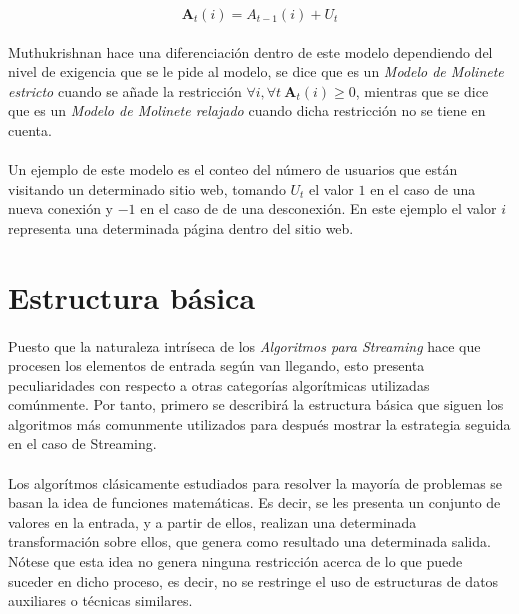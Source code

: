 \documentclass{subfiles}
\begin{document}
        \begin{equation}
        \label{eq:streaming_turnstile}
          \boldsymbol{A}_{t}(i) = {A}_{t-1}(i) + U_{t}
        \end{equation}

        \paragraph{}
        Muthukrishnan \cite{Muthukrishnan:2005:DSA:1166409.1166410} hace una diferenciación dentro de este modelo dependiendo del nivel de exigencia que se le pide al modelo, se dice que es un \emph{Modelo de Molinete estricto} cuando se añade la restricción $\forall i, \forall t \ \boldsymbol{A}_{t}(i) \geq 0$, mientras que se dice que es un \emph{Modelo de Molinete relajado} cuando dicha restricción no se tiene en cuenta.

        \paragraph{}
        Un ejemplo de este modelo es el conteo del número de usuarios que están visitando un determinado sitio web, tomando $U_t$ el valor $1$ en el caso de una nueva conexión y $-1$ en el caso de de una desconexión. En este ejemplo el valor $i$ representa una determinada página dentro del sitio web.

    \section{Estructura básica}
    \label{sec:streaming_structure}

      \paragraph{}
      Puesto que la naturaleza intríseca de los \emph{Algoritmos para Streaming} hace que procesen los elementos de entrada según van llegando, esto presenta peculiaridades con respecto a otras categorías algorítmicas utilizadas comúnmente. Por tanto, primero se describirá la estructura básica que siguen los algoritmos más comunmente utilizados para después mostrar la estrategia seguida en el caso de Streaming.

      \paragraph{}
      Los algorítmos clásicamente estudiados para resolver la mayoría de problemas se basan la idea de funciones matemáticas. Es decir, se les presenta un conjunto de valores en la entrada, y a partir de ellos, realizan una determinada transformación sobre ellos, que genera como resultado una determinada salida. Nótese que esta idea no genera ninguna restricción acerca de lo que puede suceder en dicho proceso, es decir, no se restringe el uso de estructuras de datos auxiliares o técnicas similares.
\end{document}

